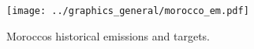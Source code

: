 \begin{figure}[h!]
    \centering
    \texttt{[image: ../graphics\_general/morocco\_em.pdf]}
    \caption{Moroccos historical emissions and targets.}
    \label{fig:morocco_em}
\end{figure}


%


